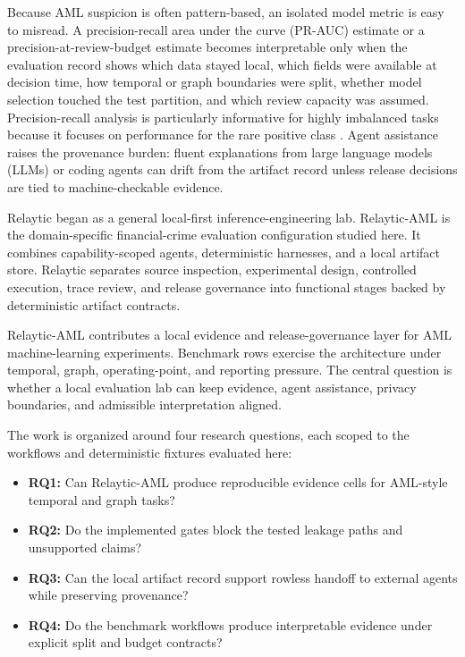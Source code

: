 \documentclass[11pt]{article}
\begin{document}
Because AML suspicion is often pattern-based, an isolated model metric is easy to misread. A precision-recall area under the curve (PR-AUC) estimate or a precision-at-review-budget estimate becomes interpretable only when the evaluation record shows which data stayed local, which fields were available at decision time, how temporal or graph boundaries were split, whether model selection touched the test partition, and which review capacity was assumed. Precision-recall analysis is particularly informative for highly imbalanced tasks because it focuses on performance for the rare positive class \citep{saito2015precisionrecall}. Agent assistance raises the provenance burden: fluent explanations from large language models (LLMs) or coding agents can drift from the artifact record unless release decisions are tied to machine-checkable evidence.

Relaytic began as a general local-first inference-engineering lab. Relaytic-AML is the domain-specific financial-crime evaluation configuration studied here. It combines capability-scoped agents, deterministic harnesses, and a local artifact store. Relaytic separates source inspection, experimental design, controlled execution, trace review, and release governance into functional stages backed by deterministic artifact contracts.

Relaytic-AML contributes a local evidence and release-governance layer for AML machine-learning experiments. Benchmark rows exercise the architecture under temporal, graph, operating-point, and reporting pressure. The central question is whether a local evaluation lab can keep evidence, agent assistance, privacy boundaries, and admissible interpretation aligned.

The work is organized around four research questions, each scoped to the workflows and deterministic fixtures evaluated here:

\begin{itemize}
\item \textbf{RQ1:} Can Relaytic-AML produce reproducible evidence cells for AML-style temporal and graph tasks?
\item \textbf{RQ2:} Do the implemented gates block the tested leakage paths and unsupported claims?
\item \textbf{RQ3:} Can the local artifact record support rowless handoff to external agents while preserving provenance?
\item \textbf{RQ4:} Do the benchmark workflows produce interpretable evidence under explicit split and budget contracts?
\end{itemize}
\end{document}
